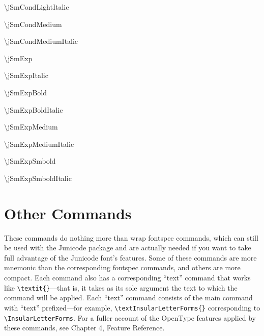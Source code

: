 \documentclass{article}
\begin{document}
\begin{multicols}{3}
    \textbackslash jSmCondLightItalic
    
    \textbackslash jSmCondMedium
    
    \textbackslash jSmCondMediumItalic
    
    \textbackslash jSmExp
    
    \textbackslash jSmExpItalic
    
    \textbackslash jSmExpBold
    
    \textbackslash jSmExpBoldItalic
    
    \textbackslash jSmExpMedium
    
    \textbackslash jSmExpMediumItalic
    
    \textbackslash jSmExpSmbold
    
    \textbackslash jSmExpSmboldItalic    
\end{multicols}

\section{Other Commands}

These commands do nothing more than wrap fontspec commands, which can still be
used with the Junicode package and are actually needed if you want to take full
advantage of the Junicode font’s features. Some of these commands are more mnemonic
than the corresponding fontspec commands, and others are more compact. Each command
also has a corresponding “text” command that works like 
{\small\verb|\textit{}|}—that is, it takes
as its sole argument the text to which the command will be applied. Each “text” command
consists of the main command with “text” prefixed—for example,
{\small\verb|\textInsularLetterForms{}|}
corresponding to {\small\verb|\InsularLetterForms|}.  For a fuller account of the OpenType features
applied by these commands, see Chapter 4, Feature Reference.
\end{document}
